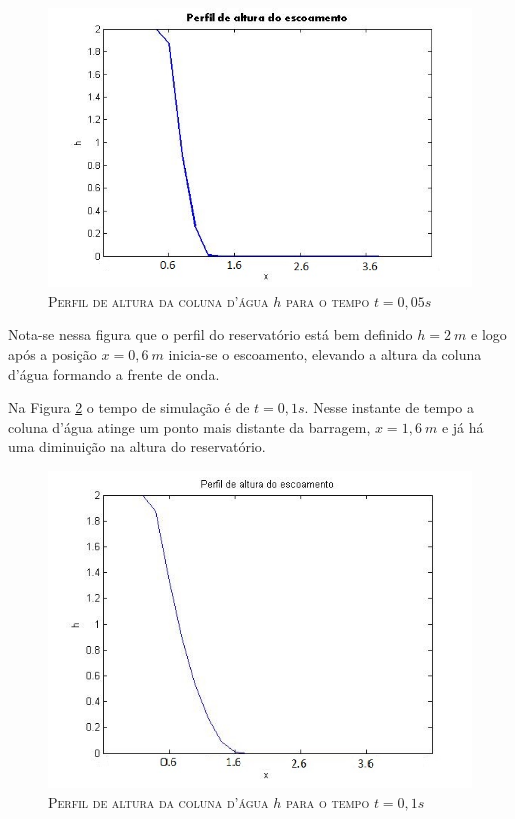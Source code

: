  \begin{figure}[H]
 	\centering
 	\includegraphics[scale=1]{figuras/Alt01s.jpg}
 	\caption{\textsc{Perfil de altura da coluna d'água $h$ para o tempo $t=0,05s$}}
 	\vspace{-0.1cm}
 	\label{Alt01s}
 \end{figure}
 Nota-se nessa figura que o perfil do reservatório está bem definido $h=2 \ m$ e logo após a posição $x=0,6 \ m$ inicia-se o escoamento, elevando a altura da coluna d'água formando a frente de onda.
 
 Na Figura \ref{alt1s} o tempo de simulação é de $t=0,1s$. Nesse instante de tempo a coluna d'água atinge um ponto mais distante da barragem, $x=1,6 \ m$ e já há uma  diminuição na altura do reservatório.
 \begin{figure}[H]
 	\centering
 	\includegraphics[scale=1]{figuras/alt1s.jpg}
 	\caption{\textsc{Perfil de altura da coluna d'água $h$ para o tempo $t=0,1s$}}
 	\vspace{-0.1cm}
 	\label{alt1s}
 \end{figure}
 
